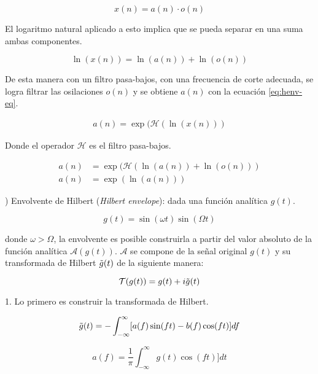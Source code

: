 \begin{equation}
  x(n) = a(n) \cdot o(n)
\end{equation}

El logaritmo natural aplicado a esto implica que se pueda separar en una suma ambas componentes.

\begin{equation}
  \ln(x(n)) = \ln(a(n)) + \ln(o(n))
\end{equation}

De esta manera con un filtro pasa-bajos, con una frecuencia de corte adecuada, se logra filtrar las osilaciones $o
(n)$ y se obtiene $a(n)$ con la ecuación \ref{eq:henv-eq}.

\begin{align} \label{eq:henv-eq}
a(n) = \exp(\mathcal{H}(\ln(x(n)))
\end{align}

Donde el operador $\mathcal{H}$ es el filtro pasa-bajos.

\begin{align*}
  a(n) &= \exp(\mathcal{H}(\ln(a(n)) + \ln(o(n))) \\
  a(n) &= \exp(\ln(a(n)))
\end{align*}

) Envolvente de Hilbert (\textit{Hilbert envelope}): dada una función analítica $g(t)$.

\begin{equation}
  g(t)=\sin(\omega t)\sin(\Omega t)
\end{equation}

donde $\omega > \Omega$, la envolvente es posible construirla a partir del valor absoluto de la función analítica
$\mathscr{A}(g(t))$. $\mathscr{A}$ se compone de la señal original $g(t)$ y su transformada de Hilbert $\Tilde{g}(t)
$ de la siguiente manera:

\begin{equation}
  \mathcal{T}(g(t))=g(t) + i\Tilde{g}(t)
\end{equation}

1. Lo primero es construir la transformada de Hilbert.

\begin{equation} \label{eq:hilbert_transform}
\Tilde{g}(t)=-\int_{-\infty}^{\infty} [a(f)\sin(ft) - b(f)\cos(ft)]df
\end{equation}

\begin{equation}
a(f)=\frac{1}{\pi}\int_{-\infty}^{\infty} g(t)\cos(ft)]dt
\end{equation}

